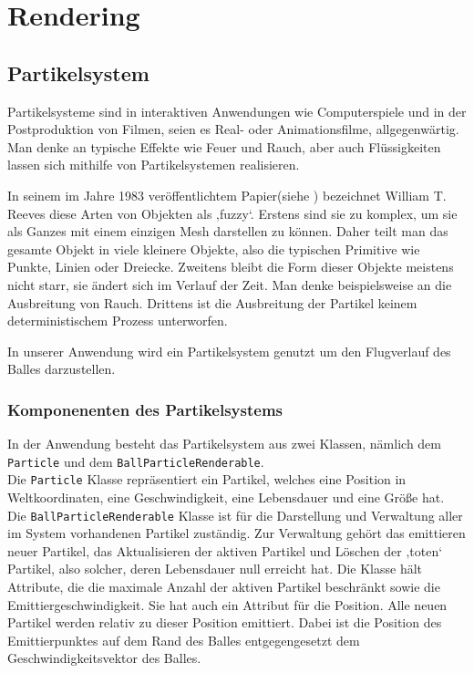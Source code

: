 
\chapter{Rendering}
\label{Kapitel 2}
%

\section{Partikelsystem}
\label{Kapitel_2_-_Unterkapitel_1}
%
Partikelsysteme sind in interaktiven Anwendungen wie Computerspiele und in der Postproduktion von Filmen, seien es Real- oder Animationsfilme, allgegenwärtig.
Man denke an typische Effekte wie Feuer und Rauch, aber auch Flüssigkeiten lassen sich mithilfe von Partikelsystemen realisieren.

In seinem im Jahre 1983 veröffentlichtem Papier(siehe \cite{reeves:particle_systems}) bezeichnet William T. Reeves diese Arten von Objekten als ‚fuzzy‘. Erstens sind sie zu komplex, um sie als Ganzes mit einem einzigen Mesh darstellen zu können. Daher teilt man das gesamte Objekt in viele kleinere Objekte, also die typischen Primitive wie Punkte, Linien oder Dreiecke. Zweitens bleibt die Form dieser Objekte meistens nicht starr, sie ändert sich im Verlauf der Zeit. Man denke beispielsweise an die Ausbreitung von Rauch. Drittens ist die Ausbreitung der Partikel keinem deterministischem Prozess unterworfen.

In unserer Anwendung wird ein Partikelsystem genutzt um den Flugverlauf des Balles darzustellen. 

\subsection{Komponenenten des Partikelsystems}
\label{Kapitel_2_-_Unterkapitel_1.1}
%
In der Anwendung besteht das Partikelsystem aus zwei Klassen, nämlich dem {\texttt{Particle}} und dem {\texttt{BallParticleRenderable}}.\\
Die {\texttt{Particle}} Klasse repräsentiert ein Partikel, welches eine Position in Weltkoordinaten, eine Geschwindigkeit, eine Lebensdauer und eine Größe hat. 
Die {\texttt{BallParticleRenderable}} Klasse ist für die Darstellung und Verwaltung aller im System vorhandenen Partikel zuständig. Zur Verwaltung gehört das emittieren neuer Partikel, das Aktualisieren der aktiven Partikel und Löschen der ‚toten‘ Partikel, also solcher, deren Lebensdauer null erreicht hat. Die Klasse hält Attribute, die die maximale Anzahl der aktiven Partikel beschränkt sowie die Emittiergeschwindigkeit.  Sie hat auch ein Attribut für die Position. Alle neuen Partikel werden relativ zu dieser Position emittiert. Dabei ist die Position des Emittierpunktes auf dem Rand des Balles entgegengesetzt dem Geschwindigkeitsvektor des Balles.

